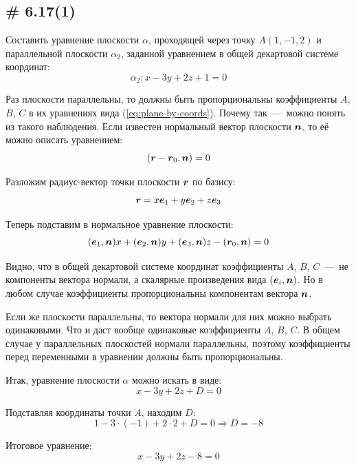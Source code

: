 \documentclass[a4paper,12pt]{article}
\begin{document}
  
  \subsection{\# 6.17(1)}
  
  \begin{problem}
    Составить уравнение плоскости $\alpha$, проходящей через точку $A(1, -1, 2)$ и параллельной плоскости $\alpha_2$, заданной уравнением в общей декартовой системе координат:
    \[
      \alpha_2\colon x - 3y + 2z + 1 = 0
    \]
  \end{problem}
  
  \begin{solution}
    Раз плоскости параллельны, то должны быть пропорциональны коэффициенты $A$, $B$, $C$ в их уравнениях вида (\ref{eq:plane-by-coords}).
    Почему так~---~можно понять из такого наблюдения.
    Если известен нормальный вектор плоскости $\boldsymbol n$, то её можно описать уравнением:
    \[
      (\boldsymbol r - \boldsymbol r_0, \boldsymbol n) = 0
    \]
    
    Разложим радиус-вектор точки плоскости $\boldsymbol r$ по базису:
    \[
      \boldsymbol r = x \boldsymbol e_1 + y \boldsymbol e_2 + z \boldsymbol e_3
    \]
    
    Теперь подставим в нормальное уравнение плоскости:
    \[
      (\boldsymbol e_1, \boldsymbol n) x + (\boldsymbol e_2, \boldsymbol n) y + (\boldsymbol e_3, \boldsymbol n) z - (\boldsymbol r_0, \boldsymbol n) = 0
    \]
    
    Видно, что в общей декартовой системе координат коэффициенты $A$, $B$, $C$~---~не компоненты вектора нормали, а скалярные произведения вида $(\boldsymbol e_i, \boldsymbol n)$.
    Но в любом случае коэффициенты пропорциональны компонентам вектора $\boldsymbol n$.
    
    Если же плоскости параллельны, то вектора нормали для них можно выбрать одинаковыми.
    Что и даст вообще одинаковые коэффициенты $A$, $B$, $C$.
    В общем случае у параллельных плоскостей нормали параллельны, поэтому коэффициенты перед переменными в уравнении должны быть пропорциональны.
    
    Итак, уравнение плоскости $\alpha$ можно искать в виде:
    \[
      x - 3y + 2z + D = 0
    \]
    
    Подставляя координаты точки $A$, находим $D$:
    \[
      1 - 3 \cdot (-1) + 2 \cdot 2 + D = 0 \Rightarrow D = -8
    \]
    
    Итоговое уравнение:
    \[
      x - 3y + 2z - 8 = 0
    \]
  \end{solution}
  
\end{document}
